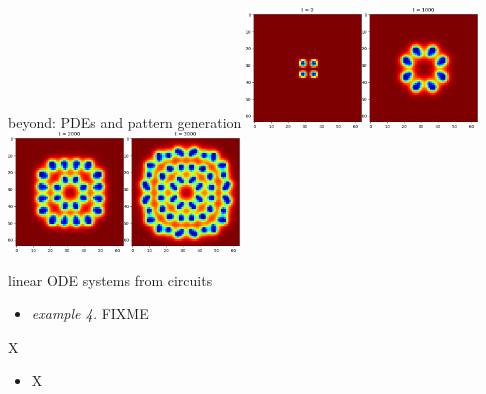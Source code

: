 \documentclass[urlcolor=blue,dvipsnames]{beamer}
\begin{document}
\begin{frame}{beyond: PDEs and pattern generation}
\mbox{\includegraphics[width=0.23\textwidth]{figs/pattern0}\quad\includegraphics[width=0.23\textwidth]{figs/pattern2}\quad\includegraphics[width=0.23\textwidth]{figs/pattern4}\quad\includegraphics[width=0.23\textwidth]{figs/pattern6}}

\bigskip
\end{frame}



\begin{frame}{linear ODE systems from circuits}

\begin{itemize}
\item \emph{example 4.} FIXME
\end{itemize}
\end{frame}


\begin{frame}{X}

\begin{itemize}
\item X
\end{itemize}
\end{frame}
\end{document}
